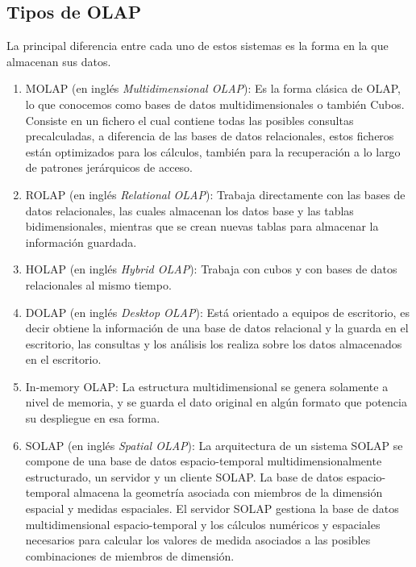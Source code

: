 \documentclass[DIV=calc, paper=a4, fontsize=11pt, twocolumn]{scrartcl}	 %
\begin{document}

\subsection*{Tipos de OLAP}
La principal diferencia entre cada uno de estos sistemas es la forma en la que almacenan sus datos.

\begin{enumerate}

\item MOLAP (en ingl\'{e}s \textit{Multidimensional OLAP}): %
Es la forma cl\'{a}sica de OLAP, lo que conocemos como bases de datos multidimensionales o tambi\'{e}n Cubos. Consiste en un fichero el cual contiene todas las posibles consultas precalculadas, a diferencia de las bases de datos relacionales, estos ficheros est\'{a}n optimizados para los c\'{a}lculos, tambi\'{e}n para la recuperaci\'{o}n a lo largo de patrones jer\'{a}rquicos de acceso.

\item ROLAP (en ingl\'{e}s \textit{Relational OLAP}): %
Trabaja directamente con las bases de datos relacionales, las cuales almacenan los datos base y las tablas bidimensionales, mientras que se crean nuevas tablas para almacenar la informaci\'{o}n guardada.

\item HOLAP (en ingl\'{e}s \textit{Hybrid OLAP}): %
Trabaja con cubos y con bases de datos relacionales al mismo tiempo.

\item DOLAP (en ingl\'{e}s \textit{Desktop OLAP}): %
Est\'{a} orientado a equipos de escritorio, es decir obtiene la informaci\'{o}n de una base de datos relacional y la guarda en el escritorio, las consultas y los an\'{a}lisis los realiza sobre los datos almacenados en el escritorio.\\

\item In-memory OLAP: 
La estructura multidimensional se genera solamente a nivel de memoria, y se guarda el dato original en alg\'{u}n formato que potencia su despliegue en esa forma.

\item SOLAP (en ingl\'{e}s \textit{Spatial OLAP}):
La arquitectura de un sistema SOLAP se compone de una base de datos espacio-temporal multidimensionalmente estructurado, un servidor y un cliente SOLAP. La base de datos espacio-temporal almacena la geometr\'{i}a asociada con miembros de la dimensi\'{o}n espacial y medidas espaciales. El servidor SOLAP gestiona la base de datos multidimensional espacio-temporal y los c\'{a}lculos num\'{e}ricos y espaciales necesarios para calcular los valores de medida asociados a las posibles combinaciones de miembros de dimensi\'{o}n.

\end{enumerate}
\end{document}
